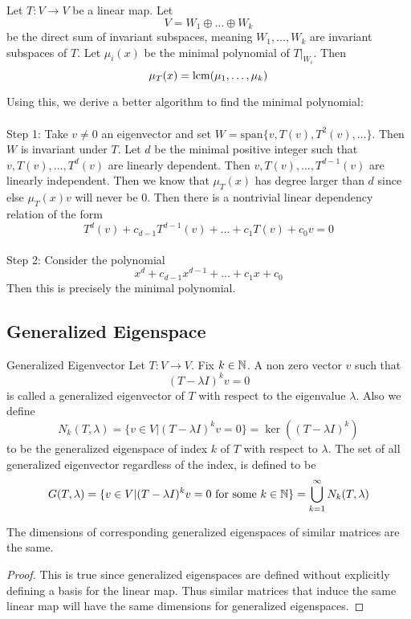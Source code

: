 \documentclass[a4paper]{article}
\begin{document}
\begin{lmm}{}{} Let $T:V\to V$ be a linear map. Let $$V=W_1\oplus\dots\oplus W_k$$ be the direct sum of invariant subspaces, meaning $W_1,\dots,W_k$ are invariant subspaces of $T$. Let $\mu_i(x)$ be the minimal polynomial of $T|_{W_i}$. Then $$\mu_T(x)=\operatorname{lcm}(\mu_1,\dots,\mu_k)$$
\end{lmm}

Using this, we derive a better algorithm to find the minimal polynomial: \\~\\
Step 1: Take $v\neq 0$ an eigenvector and set $W=\text{span}\{v,T(v),T^2(v),\dots\}$. Then $W$ is invariant under $T$. Let $d$ be the minimal positive integer such that $v,T(v),\dots,T^d(v)$ are linearly dependent. Then $v,T(v),\dots,T^{d-1}(v)$ are linearly independent. Then we know that $\mu_T(x)$ has degree larger than $d$ since else $\mu_T(x)v$ will never be $0$. Then there is a nontrivial linear dependency relation of the form $$T^d(v)+c_{d-1}T^{d-1}(v)+\dots+c_1T(v)+c_0v=0$$\\
Step 2: Consider the polynomial $$x^d+c_{d-1}x^{d-1}+\dots+c_1x+c_0$$ Then this is precisely the minimal polynomial. 

\subsection{Generalized Eigenspace}
\begin{defn}{Generalized Eigenvector}{} Let $T:V\to V$. Fix $k\in\mathbb{N}$. A non zero vector $v$ such that $$(T-\lambda I)^kv=0$$ is called a generalized eigenvector of $T$ with respect to the eigenvalue $\lambda$. Also we define $$N_k(T,\lambda)=\{v\in V|(T-\lambda I)^kv=0\}=\ker((T-\lambda I)^k)$$ to be the generalized eigenspace of index $k$ of $T$ with respect to $\lambda$. The set of all generalized eigenvector regardless of the index, is defined to be $$G(T,\lambda)=\{v\in V|(T-\lambda I)^kv=0\text{ for some }k\in\mathbb{N}\}=\bigcup_{k=1}^\infty N_k(T,\lambda)$$
\end{defn}

\begin{prp}{}{} The dimensions of corresponding generalized eigenspaces of similar matrices are the same. \tcbline
\begin{proof}
This is true since generalized eigenspaces are defined without explicitly defining a basis for the linear map. Thus similar matrices that induce the same linear map will have the same dimensions for generalized eigenspaces. 
\end{proof}
\end{prp}
\end{document}
